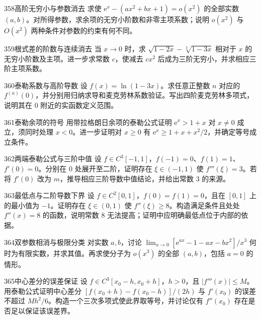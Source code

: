 \begin{exercise}{358}{高阶无穷小与参数消去}
求使 $\mathrm e^x-(ax^2+bx+1)=o(x^2)$ 的全部实数 $(a,b)$。对所得参数，求余项的无穷小阶数和非零主项系数；说明 $o(x^2)$ 与 $O(x^2)$ 两种条件对参数的约束有何不同。
\end{exercise}
\begin{exercise}{359}{根式差的阶数与连续消去}
当 $x\to0$ 时，求 $\sqrt{1-2x}-\sqrt[3]{1-3x}$ 相对于 $x$ 的无穷小阶数及主项。进一步求常数 $c$，使减去 $cx^2$ 后成为三阶无穷小，并求相应三阶主项系数。
\end{exercise}
\begin{exercise}{360}{泰勒系数与高阶导数}
设 $f(x)=\ln(1-3x)$。求任意正整数 $n$ 对应的 $f^{(n)}(0)$，并分别用归纳求导和麦克劳林系数验证。写出四阶麦克劳林多项式，说明其在 $0$ 附近的实函数定义范围。
\end{exercise}
\begin{exercise}{361}{泰勒余项的符号}
用带拉格朗日余项的泰勒公式证明 $\mathrm e^x>1+x$ 对 $x\ne0$ 成立，须同时处理 $x<0$。进一步证明对 $x\ge0$ 有 $\mathrm e^x\ge1+x+x^2/2$，并确定等号成立条件。
\end{exercise}
\begin{exercise}{362}{两端泰勒公式与三阶中值}
设 $f\in C^3[-1,1]$，$f(-1)=0$、$f(1)=1$、$f'(0)=0$。分别在 $0$ 处展开至二阶，证明存在 $\xi\in(-1,1)$ 使 $f'''(\xi)=3$。若将 $f'(0)$ 改为 $m$，推导相应三阶导数中值结论，并给出常数 $3$ 的来源。
\end{exercise}
\begin{exercise}{363}{最低点与二阶导数下界}
设 $f\in C^2[0,1]$，$f(0)=f(1)=0$，且在 $[0,1]$ 上的最小值为 $-1$。证明存在 $\xi\in(0,1)$ 使 $f''(\xi)\ge8$。构造满足条件且处处 $f''(x)=8$ 的函数，说明常数 $8$ 无法提高；证明中应明确最低点位于内部的依据。
\end{exercise}
\begin{exercise}{364}{双参数相消与极限分类}
对实数 $a,b$，讨论 $\lim_{x\to0}[\mathrm e^{ax}-1-ax-bx^2]/x^3$ 何时为有限实数，并求其值。再求使分子为 $o(x^3)$ 的全部 $(a,b)$，包括 $a=0$ 的情形。
\end{exercise}
\begin{exercise}{365}{中心差分的误差保证}
设 $f\in C^3[x_0-h,x_0+h]$，$h>0$，且 $|f'''(x)|\le M$。用泰勒公式证明中心差分 $[f(x_0+h)-f(x_0-h)]/(2h)$ 与 $f'(x_0)$ 的误差不超过 $Mh^2/6$。构造一个三次多项式使此界取等号，并讨论仅有 $f''(x_0)$ 存在是否足以保证该误差界。
\end{exercise}
